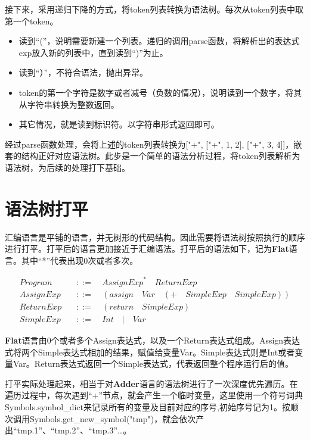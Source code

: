 接下来，采用递归下降的方式，将token列表转换为语法树。每次从token列表中取第一个token。
\begin{itemize}
  \item 读到“(”，说明需要新建一个列表。递归的调用parse函数，将解析出的表达式exp放入新的列表中，直到读到“)”为止。
  \item 读到“）”，不符合语法，抛出异常。
  \item token的第一个字符是数字或者减号（负数的情况），说明读到一个数字，将其从字符串转换为整数返回。
  \item 其它情况，就是读到标识符。以字符串形式返回即可。
\end{itemize}

经过parse函数处理，会将上述的token列表转换为["+", ["+", 1, 2], ["+", 3, 4]]，嵌套的结构正好对应语法树。此步是一个简单的语法分析过程，将token列表解析为语法树，为后续的处理打下基础。

\section{语法树打平}

汇编语言是平铺的语言，并无树形的代码结构。因此需要将语法树按照执行的顺序进行打平。打平后的语言更加接近于汇编语法。打平后的语法如下，记为\textbf{Flat}语言。其中“*”代表出现0次或者多次。

\begin{equation}
\begin{aligned}
  \label{eq:3}
   Program \quad &::= \quad {AssignExp}^* \quad ReturnExp \\
   AssignExp \quad &::= \quad (assign \quad Var \quad (+ \quad SimpleExp \quad SimpleExp)) \\
   ReturnExp \quad &::= \quad (return \quad SimpleExp) \\
   SimpleExp \quad &::=  \quad Int \quad | \quad Var
\end{aligned}
\end{equation}

\textbf{Flat}语言由0个或者多个Assign表达式，以及一个Return表达式组成。Assign表达式将两个Simple表达式相加的结果，赋值给变量Var。Simple表达式则是Int或者变量Var。Return表达式返回一个Simple表达式，代表返回整个程序运行后的值。

打平实际处理起来，相当于对\textbf{Adder}语言的语法树进行了一次深度优先遍历。在遍历过程中，每次遇到“+”节点，就会产生一个临时变量，这里使用一个符号词典Symbols.symbol\_dict来记录所有的变量及目前对应的序号,初始序号记为1。按顺次调用Symbols.get\_new\_symbol("tmp")，就会依次产出“tmp.1”、“tmp.2”、“tmp.3”…。

